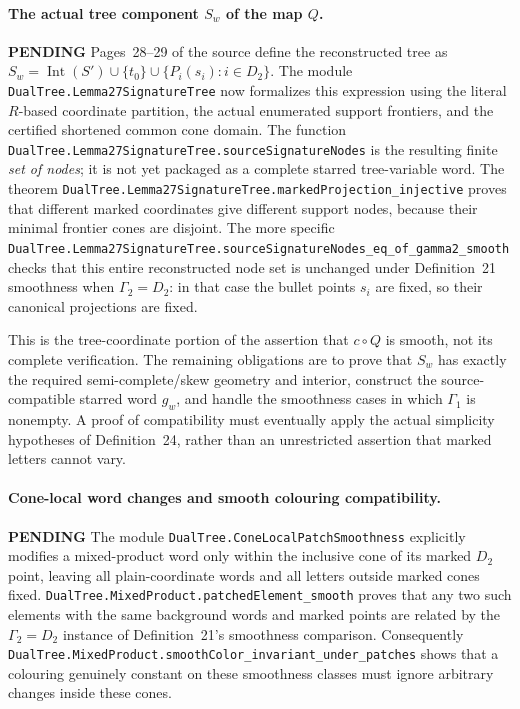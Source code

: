 \documentclass[11pt]{article}
\newcommand{\todo}{\textcolor{gray!70!black}{\textbf{PENDING}}}
\newcommand{\lean}[1]{\texttt{#1}}
\begin{document}
\paragraph{The actual tree component $S_w$ of the map $Q$.} \todo
Pages~28--29 of the source define the reconstructed tree as
$S_w=\operatorname{Int}(S')\cup\{t_0\}
\cup\{P_i(s_i):i\in D_2\}$.
The module \lean{DualTree.Lemma27SignatureTree} now formalizes
this expression using the literal $R$-based coordinate partition,
the actual enumerated support frontiers, and the certified shortened
common cone domain.  The function
\lean{DualTree.Lemma27SignatureTree.sourceSignatureNodes}
is the resulting finite \emph{set of nodes}; it is not yet packaged
as a complete starred tree-variable word.
The theorem
\lean{DualTree.Lemma27SignatureTree.markedProjection_injective}
proves that different marked coordinates give different support nodes,
because their minimal frontier cones are disjoint.
The more specific
\lean{DualTree.Lemma27SignatureTree.sourceSignatureNodes_eq_of_gamma2_smooth}
checks that this entire reconstructed node set is unchanged under
Definition~21 smoothness when $\Gamma_2=D_2$: in that case the
bullet points $s_i$ are fixed, so their canonical projections are fixed.

This is the tree-coordinate portion of the assertion that
$c\circ Q$ is smooth, not its complete verification.
The remaining obligations are to prove that $S_w$ has exactly the
required semi-complete/skew geometry and interior, construct the
source-compatible starred word $g_w$, and handle the smoothness
cases in which $\Gamma_1$ is nonempty.  A proof of compatibility
must eventually apply the actual simplicity hypotheses of
Definition~24, rather than an unrestricted assertion that marked
letters cannot vary.


\paragraph{Cone-local word changes and smooth colouring compatibility.} \todo
The module \lean{DualTree.ConeLocalPatchSmoothness} explicitly modifies
a mixed-product word only within the inclusive cone of its marked
$D_2$ point, leaving all plain-coordinate words and all letters
outside marked cones fixed.
\lean{DualTree.MixedProduct.patchedElement_smooth}
proves that any two such elements with the same background words and
marked points are related by the $\Gamma_2=D_2$ instance of
Definition~21's smoothness comparison.  Consequently
\lean{DualTree.MixedProduct.smoothColor_invariant_under_patches}
shows that a colouring genuinely constant on these smoothness
classes must ignore arbitrary changes inside these cones.
\end{document}
